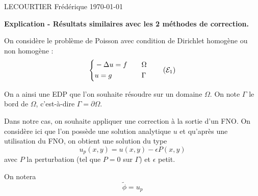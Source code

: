 \documentclass[french]{article}
\begin{document}
	LECOURTIER Frédérique \hfill \today
	\begin{center}
		\Large\textbf{{Explication - Résultats similaires avec les 2 méthodes de correction.}}\\
	\end{center}
	\graphicspath{{images/}}
	
	On considère le problème de Poisson avec condition de Dirichlet homogène ou non homogène :
	\begin{equation}
		\label{pb1}
		\left\{\begin{aligned}
			&-\Delta u=f \quad &&\Omega \\
			&u=g \quad &&\Gamma
		\end{aligned}\right. \tag{$\mathcal{E}_1$}
	\end{equation}
	
	On a ainsi une EDP que l'on souhaite résoudre sur un domaine $\Omega$. On note $\Gamma$ le bord de $\Omega$, c'est-à-dire $\Gamma=\partial\Omega$. 
	
	Dans notre cas, on souhaite appliquer une correction à la sortie d'un FNO.
	On considère ici que l'on possède une solution analytique $u$ et qu'après une utilisation du FNO, on obtient une solution du type
	\begin{equation*}
		\label{phi_tild}
		u_p(x,y) = u(x,y)-\epsilon P(x,y)
	\end{equation*}
	avec $P$ la perturbation (tel que $P=0$ sur $\Gamma$) et $\epsilon$ petit.
	
	On notera
	$$\tilde{\phi}=u_p$$
\end{document}
